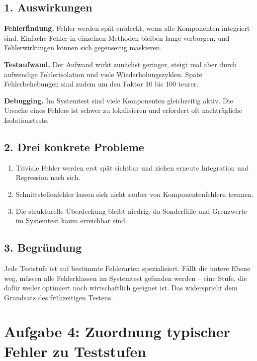 \documentclass[
	fontsize=12pt,          %
	paper=a4,               %
	numbers=noenddot,       %
	listof=totoc,           %
	listof=entryprefix,     %
	listof=nochaptergap,    %
	bibliography=totoc,     %
	parskip=half,           %
	openany                 %
]{scrbook}
\begin{document}
\section*{1. Auswirkungen}

\textbf{Fehlerfindung.}
Fehler werden spät entdeckt, wenn alle Komponenten integriert sind.
Einfache Fehler in einzelnen Methoden bleiben lange verborgen, und Fehlerwirkungen können sich gegenseitig maskieren.

\textbf{Testaufwand.}
Der Aufwand wirkt zunächst geringer, steigt real aber durch aufwendige Fehlerisolation und viele Wiederholungszyklen.
Späte Fehlerbehebungen sind zudem um den Faktor 10 bis 100 teurer.

\textbf{Debugging.}
Im Systemtest sind viele Komponenten gleichzeitig aktiv.
Die Ursache eines Fehlers ist schwer zu lokalisieren und erfordert oft nachträgliche Isolationstests.


\section*{2. Drei konkrete Probleme}

\begin{enumerate}
	\item Triviale Fehler werden erst spät sichtbar und ziehen erneute Integration und Regression nach sich.
	\item Schnittstellenfehler lassen sich nicht sauber von Komponentenfehlern trennen.
	\item Die strukturelle Überdeckung bleibt niedrig, da Sonderfälle und Grenzwerte im Systemtest kaum erreichbar sind.
\end{enumerate}


\section*{3. Begründung}

Jede Teststufe ist auf bestimmte Fehlerarten spezialisiert.
Fällt die untere Ebene weg, müssen alle Fehlerklassen im Systemtest gefunden werden -- eine Stufe, die dafür weder optimiert noch wirtschaftlich geeignet ist.
Das widerspricht dem Grundsatz des frühzeitigen Testens.


\chapter*{Aufgabe 4: Zuordnung typischer Fehler zu Teststufen}
\end{document}
